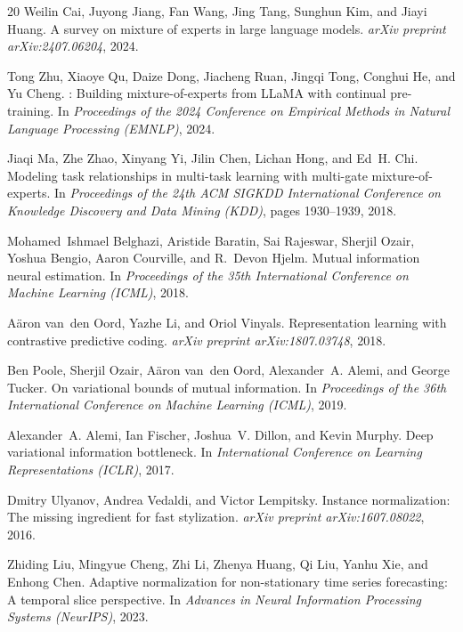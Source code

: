 \documentclass{article}
\begin{document}
\begin{thebibliography}{20}
Weilin Cai, Juyong Jiang, Fan Wang, Jing Tang, Sunghun Kim, and Jiayi Huang.
\newblock A survey on mixture of experts in large language models.
\newblock \textit{arXiv preprint arXiv:2407.06204}, 2024.

Tong Zhu, Xiaoye Qu, Daize Dong, Jiacheng Ruan, Jingqi Tong, Conghui He, and Yu Cheng.
: Building mixture-of-experts from {LLaMA} with continual pre-training.
\newblock In \textit{Proceedings of the 2024 Conference on Empirical Methods in Natural Language Processing (EMNLP)}, 2024.

Jiaqi Ma, Zhe Zhao, Xinyang Yi, Jilin Chen, Lichan Hong, and Ed~H. Chi.
\newblock Modeling task relationships in multi-task learning with multi-gate mixture-of-experts.
\newblock In \textit{Proceedings of the 24th ACM SIGKDD International Conference on Knowledge Discovery and Data Mining (KDD)}, pages 1930--1939, 2018.

Mohamed~Ishmael Belghazi, Aristide Baratin, Sai Rajeswar, Sherjil Ozair, Yoshua Bengio, Aaron Courville, and R.~Devon Hjelm.
\newblock Mutual information neural estimation.
\newblock In \textit{Proceedings of the 35th International Conference on Machine Learning (ICML)}, 2018.

A\"{a}ron van~den Oord, Yazhe Li, and Oriol Vinyals.
\newblock Representation learning with contrastive predictive coding.
\newblock \textit{arXiv preprint arXiv:1807.03748}, 2018.

Ben Poole, Sherjil Ozair, A\"{a}ron van~den Oord, Alexander~A. Alemi, and George Tucker.
\newblock On variational bounds of mutual information.
\newblock In \textit{Proceedings of the 36th International Conference on Machine Learning (ICML)}, 2019.

Alexander~A. Alemi, Ian Fischer, Joshua~V. Dillon, and Kevin Murphy.
\newblock Deep variational information bottleneck.
\newblock In \textit{International Conference on Learning Representations (ICLR)}, 2017.

Dmitry Ulyanov, Andrea Vedaldi, and Victor Lempitsky.
\newblock Instance normalization: The missing ingredient for fast stylization.
\newblock \textit{arXiv preprint arXiv:1607.08022}, 2016.

Zhiding Liu, Mingyue Cheng, Zhi Li, Zhenya Huang, Qi Liu, Yanhu Xie, and Enhong Chen.
\newblock Adaptive normalization for non-stationary time series forecasting: A temporal slice perspective.
\newblock In \textit{Advances in Neural Information Processing Systems (NeurIPS)}, 2023.

\end{thebibliography}
\end{document}
